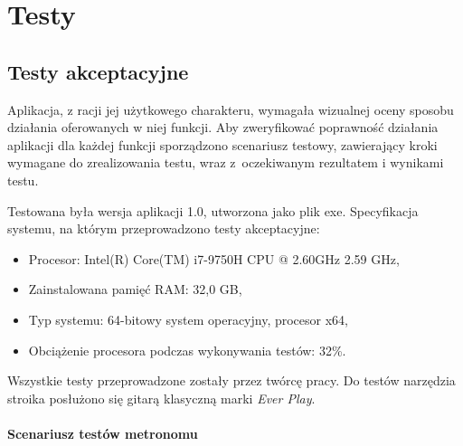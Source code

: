 \chapter{Testy}
\section{Testy akceptacyjne}
Aplikacja, z racji jej użytkowego charakteru, wymagała wizualnej oceny sposobu działania oferowanych w niej funkcji.
Aby zweryfikować poprawność działania aplikacji dla każdej funkcji sporządzono scenariusz testowy, zawierający kroki wymagane do zrealizowania testu, wraz z~oczekiwanym rezultatem i wynikami testu.

Testowana była wersja aplikacji 1.0, utworzona jako plik exe. 
Specyfikacja systemu, na którym przeprowadzono testy akceptacyjne:
\begin{itemize}
    \item Procesor: Intel(R) Core(TM) i7-9750H CPU @ 2.60GHz 2.59 GHz, 
    \item Zainstalowana pamięć RAM: 32,0 GB,
    \item Typ systemu: 64-bitowy system operacyjny, procesor x64,
    \item Obciążenie procesora podczas wykonywania testów: 32\%.
\end{itemize}
Wszystkie testy przeprowadzone zostały przez twórcę pracy. Do testów narzędzia stroika posłużono się gitarą klasyczną marki \emph{Ever Play}.

\subsubsection{Scenariusz testów metronomu}

